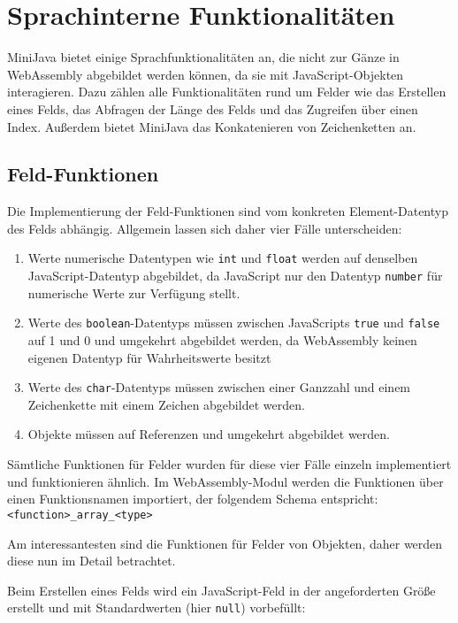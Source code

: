 \section{Sprachinterne Funktionalitäten}

MiniJava bietet einige Sprachfunktionalitäten an, die nicht zur Gänze in WebAssembly abgebildet werden können, da sie mit JavaScript-Objekten interagieren. Dazu zählen alle Funktionalitäten rund um Felder wie das Erstellen eines Felds, das Abfragen der Länge des Felds und das Zugreifen über einen Index. Außerdem bietet MiniJava das Konkatenieren von Zeichenketten an.

\subsection{Feld-Funktionen}

Die Implementierung der Feld-Funktionen sind vom konkreten Element-Datentyp des Felds abhängig. Allgemein lassen sich daher vier Fälle unterscheiden:

\begin{enumerate}
    \item Werte numerische Datentypen wie \lstinline{int} und \lstinline{float} werden auf denselben JavaScript-Daten\-typ abgebildet, da JavaScript nur den Datentyp \lstinline{number} für numerische Werte zur Verfügung stellt.
    \item Werte des \lstinline{boolean}-Datentyps müssen zwischen JavaScripts \lstinline{true} und \lstinline{false} auf 1 und 0 und umgekehrt abgebildet werden, da WebAssembly keinen eigenen Datentyp für Wahrheitswerte besitzt
    \item Werte des \lstinline{char}-Datentyps müssen zwischen einer Ganzzahl und einem Zeichenkette mit einem Zeichen abgebildet werden.
    \item Objekte  müssen auf Referenzen und umgekehrt abgebildet werden. 
\end{enumerate}

Sämtliche Funktionen für Felder wurden für diese vier Fälle einzeln implementiert und funktionieren ähnlich. Im WebAssembly-Modul werden die Funktionen über einen Funktionsnamen importiert, der folgendem Schema entspricht: \\
\lstinline{<function>_array_<type>}

Am interessantesten sind die Funktionen für Felder von Objekten, daher werden diese nun im Detail betrachtet.

Beim Erstellen eines Felds wird ein JavaScript-Feld in der angeforderten Größe erstellt und mit Standardwerten (hier \lstinline{null}) vorbefüllt:


